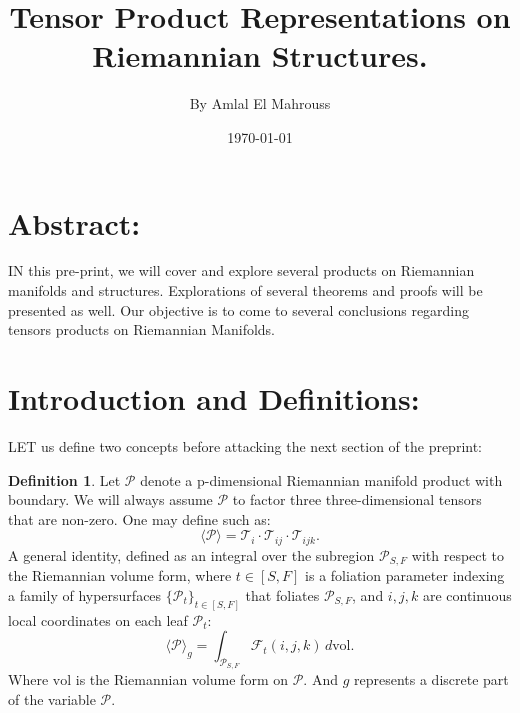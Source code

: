 \documentclass[10pt]{article}
\title{%
	\vspace{-1.5em}%
	\large\textbf{Tensor Product Representations on Riemannian Structures.}%
}
\author{By Amlal El Mahrouss}
\date{\today}
\theoremstyle{plain}
\theoremstyle{definition}
\newtheorem{definition}[theorem]{Definition}
\theoremstyle{remark}
\begin{document}

\maketitle
\tableofcontents
\newpage

\section{Abstract:}

\lettrine[lines=1, lhang=0.1, loversize=0.2]{I}N this pre-print, we will cover and explore several products on Riemannian manifolds and structures. Explorations of several theorems and proofs will be presented as well. Our objective is to come to several conclusions regarding tensors products on Riemannian Manifolds.

\section{Introduction and Definitions:}

\lettrine[lines=1, lhang=0.1, loversize=0.2]{L}ET us define two concepts before attacking the next section of the preprint:

\begin{definition}
\label{def:two-one}
    Let $\mathcal{P}$ denote a p-dimensional Riemannian manifold product with boundary. We will always assume $\mathcal{P}$ to factor three three-dimensional tensors that are non-zero. One may define such as:
    \begin{equation}
      \langle \mathcal{P} \rangle = \mathcal{T}_i \cdot \mathcal{T}_{ij} \cdot \mathcal{T}_{ijk}.
    \end{equation}
    A general identity, defined as an integral over the subregion $\mathcal{P}_{S,F}$ with respect to the Riemannian volume form, where $t \in [S, F]$ is a foliation parameter indexing a family of hypersurfaces $\{\mathcal{P}_t\}_{t \in [S,F]}$ that foliates $\mathcal{P}_{S,F}$, and $i, j, k$ are continuous local coordinates on each leaf $\mathcal{P}_t$:
    \begin{equation}
      \langle \mathcal{P} \rangle_{g} = \int_{\mathcal{P}_{S,F}} \mathcal{F}_{t}(i, j, k) \, d\mathrm{vol}.
    \end{equation}
    Where $\mathrm{vol}$ is the Riemannian volume form on $\mathcal{P}$. And $g$ represents a discrete part of the variable $\mathcal{P}$. 
\end{definition}
\end{document}
